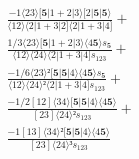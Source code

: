\documentclass[varwidth, border=5pt]{standalone}
\begin{document}
\begin{my}
$\begin{gathered}
\scriptscriptstyle\frac{-1⟨23⟩[𝟓|1+2|3⟩[2|𝟓|𝟓⟩}{⟨12⟩⟨2|1+3|2]⟨2|1+3|4]} +\\
\scriptscriptstyle\frac{1/3⟨23⟩[𝟓|1+2|3⟩⟨4𝟓⟩s_{𝟓}}{⟨12⟩⟨24⟩⟨2|1+3|4]s_{123}} +\\
\scriptscriptstyle\frac{-1/6⟨23⟩²[𝟓|𝟓|4⟩⟨4𝟓⟩s_{𝟓}}{⟨12⟩⟨24⟩²⟨2|1+3|4]s_{123}} +\\
\scriptscriptstyle\frac{-1/2[12]⟨34⟩[𝟓|𝟓|4⟩⟨4𝟓⟩}{[23]⟨24⟩²s_{123}} +\\
\scriptscriptstyle\frac{-1[13]⟨34⟩²[𝟓|𝟓|4⟩⟨4𝟓⟩}{[23]⟨24⟩³s_{123}} \phantom{+}
\end{gathered}$
\end{my}
\end{document}
